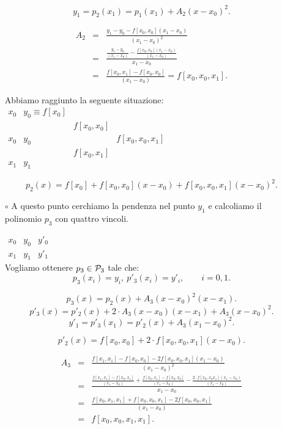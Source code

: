 \begin{itemize}
\[
y_1 = p_2(x_1) = p_1(x_1) + A_2(x-x_0)^2.
\]

\[
\begin{array}{lcl}
A_2 & = & \frac{y_1 - y_0 - f[x_0,x_0](x_1-x_0)}{(x_1-x_0)^2} \\
& = &\frac{\frac{y_1 - y_0}{(x_1 - x_0)}
- \frac{f[x_0,x_0](x_1-x_0)}{(x_1 -x_0)}}{x_1-x_0} \\
& =  & \frac{f[x_0,x_1] - f[x_0,x_0]}{(x_1-x_0)} = f[x_0,x_0,x_1].
\end{array}
\]

Abbiamo raggiunto la seguente situazione:\\

$\begin{array}{llcc}
x_0 & y_0 \equiv f[x_0]  &   \\
    &     & f[x_0,x_0] \\
x_0 & y_0  &            & f[x_0,x_0,x_1]  \\
    &     & f[x_0,x_1] & \\
x_1 & y_1 &
\end{array}$

\[
p_2(x) = f[x_0] + f[x_0,x_0](x-x_0) + f[x_0,x_0,x_1](x-x_0)^2.
\]

\item[$\circ$] A questo punto cerchiamo la pendenza nel punto $y_1$ e
calcoliamo il polinomio $p_3$ con quattro vincoli.

$\begin{array}{lllc}
x_0 & y_0  & y'_0  \\
x_1 & y_1 & y'_1
\end{array}$\\

Vogliamo ottenere $p_3 \in \mathcal{P}_3$ tale che:
\[
p_3(x_i) = y_i, \ p'_3(x_i) = y'_i, \qquad i = 0,1.
\]

\[p_3(x) = p_2(x) + A_3(x-x_0)^2(x-x_1).\]
\[p'_3(x) = p'_2(x) + 2\cdot A_3(x-x_0)(x-x_1) + A_3(x-x_0)^2.\]
\[y'_1 = p'_3(x_1) = p'_2(x) + A_3(x_1-x_0)^2.\]

\[p'_2(x)=  f[x_0,x_0] + 2 \cdot f[x_0,x_0,x_1](x-x_0).\]

\[
\begin{array}{lcl}
A_3 & = & \frac{f[x_1,x_1]-f[x_0,x_0]-2f[x_0,x_0,x_1](x_1-x_0)}{(x_1-x_0)^2} \\
& = &\frac{\frac{f[x_1,x_1] - f[x_0,x_1]}{(x_1 - x_0)}
+ \frac{f[x_0,x_1]-f[x_0,x_0]}{(x_1 -x_0)}
- \frac{2 \cdot f[x_0,x_0 x_1](x_1-x_0)}{(x_1 -x_0)}}{x_1-x_0} \\
& =  & \frac{f[x_0,x_1,x_1] + f[x_0,x_0,x_1] -2 f[x_0,x_0,x_1]}{(x_1-x_0)} \\
& = & f[x_0,x_0,x_1,x_1].
\end{array}
\]


\end{itemize}
